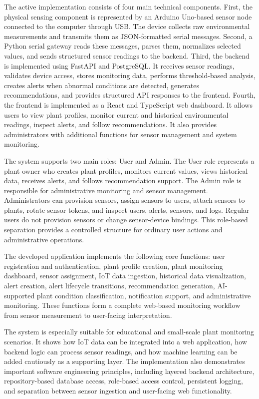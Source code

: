 The active implementation consists of four main technical components. First, the physical sensing component is represented by an Arduino Uno-based sensor node connected to the computer through USB. The device collects raw environmental measurements and transmits them as JSON-formatted serial messages. Second, a Python serial gateway reads these messages, parses them, normalizes selected values, and sends structured sensor readings to the backend. Third, the backend is implemented using FastAPI and PostgreSQL. It receives sensor readings, validates device access, stores monitoring data, performs threshold-based analysis, creates alerts when abnormal conditions are detected, generates recommendations, and provides structured API responses to the frontend. Fourth, the frontend is implemented as a React and TypeScript web dashboard. It allows users to view plant profiles, monitor current and historical environmental readings, inspect alerts, and follow recommendations. It also provides administrators with additional functions for sensor management and system monitoring.

The system supports two main roles: User and Admin. The User role represents a plant owner who creates plant profiles, monitors current values, views historical data, receives alerts, and follows recommendation support. The Admin role is responsible for administrative monitoring and sensor management. Administrators can provision sensors, assign sensors to users, attach sensors to plants, rotate sensor tokens, and inspect users, alerts, sensors, and logs. Regular users do not provision sensors or change sensor-device bindings. This role-based separation provides a controlled structure for ordinary user actions and administrative operations.

The developed application implements the following core functions: user registration and authentication, plant profile creation, plant monitoring dashboard, sensor assignment, IoT data ingestion, historical data visualization, alert creation, alert lifecycle transitions, recommendation generation, AI-supported plant condition classification, notification support, and administrative monitoring. These functions form a complete web-based monitoring workflow from sensor measurement to user-facing interpretation.

The system is especially suitable for educational and small-scale plant monitoring scenarios. It shows how IoT data can be integrated into a web application, how backend logic can process sensor readings, and how machine learning can be added cautiously as a supporting layer. The implementation also demonstrates important software engineering principles, including layered backend architecture, repository-based database access, role-based access control, persistent logging, and separation between sensor ingestion and user-facing web functionality.

